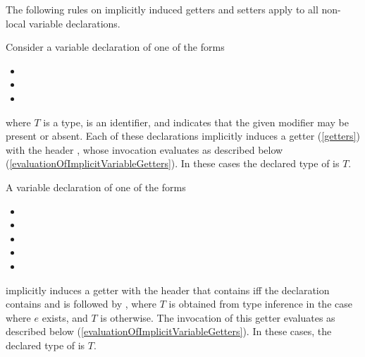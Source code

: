 \documentclass[makeidx]{article}
\begin{document}
\LMHash{}%
The following rules on implicitly induced getters and setters
apply to all non-local variable declarations.

\LMHash{}%
Consider a variable declaration of one of the forms

\begin{itemize}
\item {}
\item {}
\item {}
\end{itemize}

\noindent
where $T$ is a type, \id{} is an identifier,
and  indicates that the given modifier may be present or absent.
Each of these declarations implicitly induces a getter
(\ref{getters})
with the header ,
whose invocation evaluates as described below
(\ref{evaluationOfImplicitVariableGetters}).
In these cases the declared type of \id{} is $T$.
\EndCase

\LMHash{}%
A variable declaration of one of the forms

\begin{itemize}
\item {}
\item {}
\item {}
\item {}
\item {}
\end{itemize}

\noindent
implicitly induces a getter with the header that
contains \STATIC{} if{}f the declaration contains \STATIC{} and is followed by
,
where $T$ is obtained from type inference
in the case where $e$ exists,
and $T$ is \DYNAMIC{} otherwise.
The invocation of this getter evaluates as described below
(\ref{evaluationOfImplicitVariableGetters}).
In these cases, the declared type of \id{} is $T$.
\EndCase

\end{document}

